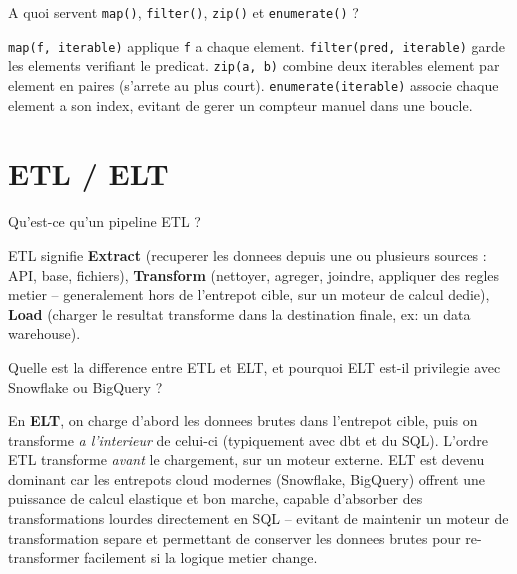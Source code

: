 \documentclass[11pt,a4paper]{article}
\begin{document}
\begin{question} A quoi servent \texttt{map()}, \texttt{filter()}, \texttt{zip()} et \texttt{enumerate()} ?
\end{question}
\begin{reponse}
\texttt{map(f, iterable)} applique \texttt{f} a chaque element. \texttt{filter(pred, iterable)} garde les elements verifiant le predicat. \texttt{zip(a, b)} combine deux iterables element par element en paires (s'arrete au plus court). \texttt{enumerate(iterable)} associe chaque element a son index, evitant de gerer un compteur manuel dans une boucle.
\end{reponse}

\newpage
\section{ETL / ELT}

\begin{question} Qu'est-ce qu'un pipeline ETL ?
\end{question}
\begin{reponse}
ETL signifie \textbf{Extract} (recuperer les donnees depuis une ou plusieurs sources : API, base, fichiers), \textbf{Transform} (nettoyer, agreger, joindre, appliquer des regles metier -- generalement hors de l'entrepot cible, sur un moteur de calcul dedie), \textbf{Load} (charger le resultat transforme dans la destination finale, ex: un data warehouse).
\end{reponse}

\begin{question} Quelle est la difference entre ETL et ELT, et pourquoi ELT est-il privilegie avec Snowflake ou BigQuery ?
\end{question}
\begin{reponse}
En \textbf{ELT}, on charge d'abord les donnees brutes dans l'entrepot cible, puis on transforme \emph{a l'interieur} de celui-ci (typiquement avec dbt et du SQL). L'ordre ETL transforme \emph{avant} le chargement, sur un moteur externe. ELT est devenu dominant car les entrepots cloud modernes (Snowflake, BigQuery) offrent une puissance de calcul elastique et bon marche, capable d'absorber des transformations lourdes directement en SQL -- evitant de maintenir un moteur de transformation separe et permettant de conserver les donnees brutes pour re-transformer facilement si la logique metier change.
\end{reponse}
\end{document}
